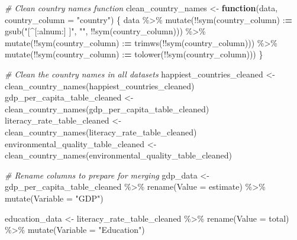 \documentclass[
]{article}
\newenvironment{Shaded}{\begin{snugshade}}{\end{snugshade}}
\newcommand{\AttributeTok}[1]{\textcolor[rgb]{0.77,0.63,0.00}{#1}}
\newcommand{\CommentTok}[1]{\textcolor[rgb]{0.56,0.35,0.01}{\textit{#1}}}
\newcommand{\ControlFlowTok}[1]{\textcolor[rgb]{0.13,0.29,0.53}{\textbf{#1}}}
\newcommand{\ErrorTok}[1]{\textcolor[rgb]{0.64,0.00,0.00}{\textbf{#1}}}
\newcommand{\FunctionTok}[1]{\textcolor[rgb]{0.00,0.00,0.00}{#1}}
\newcommand{\NormalTok}[1]{#1}
\newcommand{\OtherTok}[1]{\textcolor[rgb]{0.56,0.35,0.01}{#1}}
\newcommand{\SpecialCharTok}[1]{\textcolor[rgb]{0.00,0.00,0.00}{#1}}
\newcommand{\StringTok}[1]{\textcolor[rgb]{0.31,0.60,0.02}{#1}}
\begin{document}
\begin{Shaded}
\begin{Highlighting}[]
\CommentTok{\# Clean country names function}
\NormalTok{clean\_country\_names }\OtherTok{\textless{}{-}} \ControlFlowTok{function}\NormalTok{(data, }\AttributeTok{country\_column =} \StringTok{"country"}\NormalTok{) \{}
\NormalTok{  data }\SpecialCharTok{\%\textgreater{}\%}
    \FunctionTok{mutate}\NormalTok{(}\SpecialCharTok{!!}\FunctionTok{sym}\NormalTok{(country\_column) }\SpecialCharTok{:}\ErrorTok{=} \FunctionTok{gsub}\NormalTok{(}\StringTok{"[\^{}[:alnum:] ]"}\NormalTok{, }\StringTok{""}\NormalTok{, }\SpecialCharTok{!!}\FunctionTok{sym}\NormalTok{(country\_column))) }\SpecialCharTok{\%\textgreater{}\%}
    \FunctionTok{mutate}\NormalTok{(}\SpecialCharTok{!!}\FunctionTok{sym}\NormalTok{(country\_column) }\SpecialCharTok{:}\ErrorTok{=} \FunctionTok{trimws}\NormalTok{(}\SpecialCharTok{!!}\FunctionTok{sym}\NormalTok{(country\_column))) }\SpecialCharTok{\%\textgreater{}\%}
    \FunctionTok{mutate}\NormalTok{(}\SpecialCharTok{!!}\FunctionTok{sym}\NormalTok{(country\_column) }\SpecialCharTok{:}\ErrorTok{=} \FunctionTok{tolower}\NormalTok{(}\SpecialCharTok{!!}\FunctionTok{sym}\NormalTok{(country\_column)))}
\NormalTok{\}}

\CommentTok{\# Clean the country names in all datasets}
\NormalTok{happiest\_countries\_cleaned }\OtherTok{\textless{}{-}} \FunctionTok{clean\_country\_names}\NormalTok{(happiest\_countries\_cleaned)}
\NormalTok{gdp\_per\_capita\_table\_cleaned }\OtherTok{\textless{}{-}} \FunctionTok{clean\_country\_names}\NormalTok{(gdp\_per\_capita\_table\_cleaned)}
\NormalTok{literacy\_rate\_table\_cleaned }\OtherTok{\textless{}{-}} \FunctionTok{clean\_country\_names}\NormalTok{(literacy\_rate\_table\_cleaned)}
\NormalTok{environmental\_quality\_table\_cleaned }\OtherTok{\textless{}{-}} \FunctionTok{clean\_country\_names}\NormalTok{(environmental\_quality\_table\_cleaned)}

\CommentTok{\# Rename columns to prepare for merging}
\NormalTok{gdp\_data }\OtherTok{\textless{}{-}}\NormalTok{ gdp\_per\_capita\_table\_cleaned }\SpecialCharTok{\%\textgreater{}\%}
  \FunctionTok{rename}\NormalTok{(}\AttributeTok{Value =}\NormalTok{ estimate) }\SpecialCharTok{\%\textgreater{}\%}
  \FunctionTok{mutate}\NormalTok{(}\AttributeTok{Variable =} \StringTok{"GDP"}\NormalTok{)}

\NormalTok{education\_data }\OtherTok{\textless{}{-}}\NormalTok{ literacy\_rate\_table\_cleaned }\SpecialCharTok{\%\textgreater{}\%}
  \FunctionTok{rename}\NormalTok{(}\AttributeTok{Value =}\NormalTok{ total) }\SpecialCharTok{\%\textgreater{}\%}
  \FunctionTok{mutate}\NormalTok{(}\AttributeTok{Variable =} \StringTok{"Education"}\NormalTok{)}


\end{Highlighting}
\end{Shaded}
\end{document}
